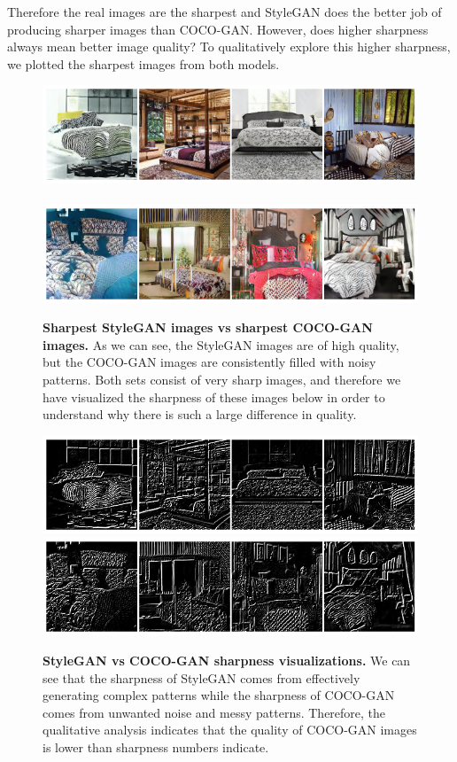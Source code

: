 \documentclass{article}
\begin{document}
        Therefore the real images are the sharpest and StyleGAN does the better job of producing sharper images than COCO-GAN.
        However, does higher sharpness always mean better image quality? To qualitatively explore this higher sharpness, we plotted the sharpest images from both models.
        \begin{figure}[H]
          \centering
          \includegraphics[scale=0.25]{sharpness-images/stylegan_sharpness.png} 
          \ \ 
          \includegraphics[scale=0.25]{sharpness-images/coco_sharpness.png}
          \caption{\textbf{Sharpest StyleGAN images vs sharpest COCO-GAN images.} As we can see, the StyleGAN images are of high quality, but the COCO-GAN images are consistently filled with noisy patterns.
            Both sets consist of very sharp images, and therefore we have visualized the sharpness of these images below in order to understand why there is such a large difference in quality.\\}   
        \end{figure} 
        \begin{figure}[H]
          \centering
          \includegraphics[scale=0.25]{sharpness-images/stylegan_sharpness_lines.png}  
          \includegraphics[scale=0.25]{sharpness-images/coco_sharpness_lines.png}
          \caption{\textbf{StyleGAN vs COCO-GAN sharpness visualizations.} We can see that the sharpness of StyleGAN comes from effectively generating complex patterns while the sharpness of COCO-GAN comes from unwanted noise and messy patterns. Therefore, the qualitative analysis indicates that the quality of COCO-GAN images is lower than sharpness numbers indicate.}
        \end{figure} 
\end{document}
